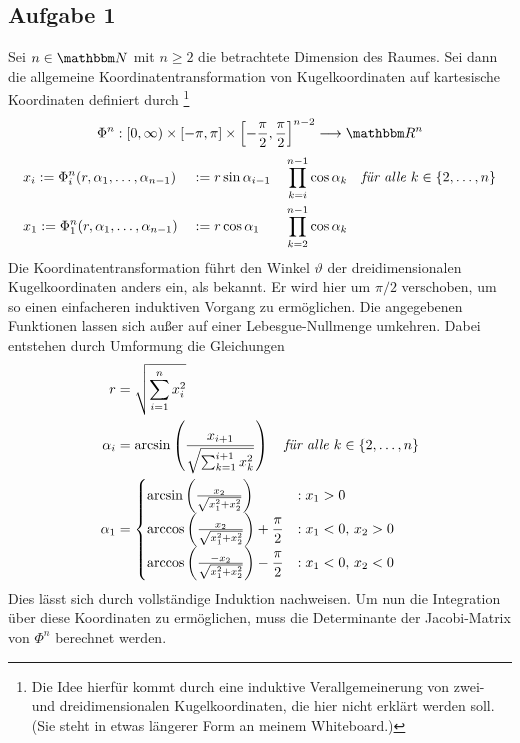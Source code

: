 \subsection*{Aufgabe 1} %
\label{sub:aufgabe_1}

	Sei $n\in\SN$ mit $n\geq 2$ die betrachtete Dimension des Raumes.
	Sei dann die allgemeine Koordinatentransformation von Kugelkoordinaten auf kartesische Koordinaten definiert durch
	\footnote{
		Die Idee hierfür kommt durch eine induktive Verallgemeinerung von zwei- und dreidimensionalen Kugelkoordinaten, die hier nicht erklärt werden soll.
		(Sie steht in etwas längerer Form an meinem Whiteboard.)
	}
	\[ \Phi^{n}:[0,\infty)\times[-\pi,\pi]\times\left[-\frac{\pi}{2},\frac{\pi}{2}\right]^{n-2}\longrightarrow \SR^n \]
	\begin{alignat}{3}
		&x_i:=\Phi^{n}_i (r,\alpha_1,\ldots,\alpha_{n-1}) &&:= r\sin \alpha_{i-1} &&\prod_{k=i}^{n-1} \cos \alpha_k \quad \textit{für alle } k\in\left\{ 2,\ldots,n \right\} \nonumber \\
		&x_1:=\Phi^{n}_1 (r,\alpha_1,\ldots,\alpha_{n-1}) &&:= r\cos \alpha_{1} &&\prod_{k=2}^{n-1} \cos \alpha_k \nonumber
	\end{alignat}
	Die Koordinatentransformation führt den Winkel $\vartheta$ der dreidimensionalen Kugelkoordinaten anders ein, als bekannt.
	Er wird hier um $\pi/2$ verschoben, um so einen einfacheren induktiven Vorgang zu ermöglichen.
	Die angegebenen Funktionen lassen sich außer auf einer Lebesgue-Nullmenge umkehren.
	Dabei entstehen durch Umformung die Gleichungen
	\begin{alignat}{2}
		r &= \sqrt{\sum_{i=1}^n x_i^2} \nonumber \\
		\alpha_i &= \arcsin\left(  \frac{x_{i+1}}{\sqrt{\sum_{k=1}^{i+1} x_k^2}}  \right) \quad \textit{für alle } k\in\left\{ 2,\ldots,n \right\} \nonumber \\
		\alpha_1 &= 
			\begin{cases}
				\arcsin\left(  \frac{x_2}{\sqrt{ x_1^2 + x_2^2 }}  \right) & :x_1 > 0 \\ 
				\arccos\left(  \frac{x_2}{\sqrt{ x_1^2 + x_2^2 }}  \right) + \dfrac{\pi}{2} & :x_1 < 0,\, x_2 > 0 \\
				\arccos\left(  \frac{-x_2}{\sqrt{ x_1^2 + x_2^2 }}  \right) -\dfrac{\pi}{2} & :x_1 < 0,\, x_2 < 0 
			\end{cases}
		\nonumber
	\end{alignat}
	Dies lässt sich durch vollständige Induktion nachweisen.
	Um nun die Integration über diese Koordinaten zu ermöglichen, muss die Determinante der Jacobi-Matrix von $\Phi^n$ berechnet werden.
